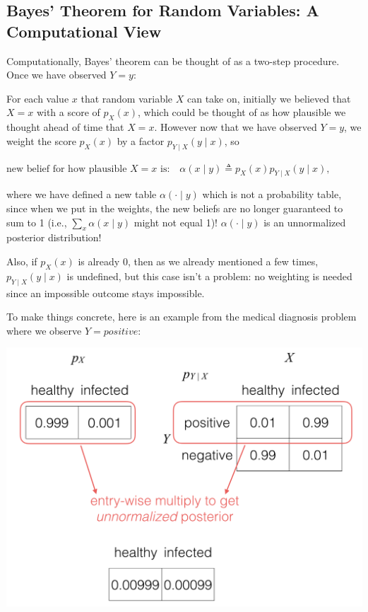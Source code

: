 \documentclass[6008notes.tex]{subfiles}
\begin{document}
\subsection{Bayes' Theorem for Random Variables: A Computational View}

Computationally, Bayes' theorem can be thought of as a two-step procedure. Once we have observed $Y=y$:

For each value $x$ that random variable $X$ can take on, initially we believed that $X=x$ with a score of $p_X(x)$, which could be thought of as how plausible we thought ahead of time that $X=x$. However now that we have observed $Y=y$, we weight the score $p_X(x)$ by a factor $p_{Y\mid X}(y\mid x)$, so

$\text {new belief for how plausible }X=x\text { is:}\quad \alpha (x\mid y)\triangleq p_{X}(x)p_{Y\mid X}(y\mid x),$

where we have defined a new table $\alpha (\cdot \mid y)$ which is not a probability table, since when we put in the weights, the new beliefs are no longer guaranteed to sum to 1 (i.e., $\sum _{x}\alpha (x\mid y)$ might not equal 1)! $\alpha (\cdot \mid y)$ is an unnormalized posterior distribution!

Also, if $p_X(x)$ is already 0, then as we already mentioned a few times, $p_{Y\mid X}(y\mid x)$ is undefined, but this case isn't a problem: no weighting is needed since an impossible outcome stays impossible.

To make things concrete, here is an example from the medical diagnosis problem where we observe $Y=positive$:

{\centering\includegraphics[scale=0.3]{images_sec-bayes-computational-view} \par}
\end{document}
